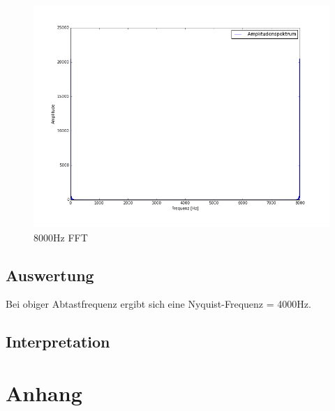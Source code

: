 \documentclass[12pt,oneside,a4paper]{report}
\begin{document}
\begin{figure}[H]
\centering\small
\includegraphics[scale=0.4]{src/8000fft.png}
\caption{8000Hz FFT}
\label{fig:8000_FFT}
\end{figure}


\section{Auswertung}
\label{chap:VERSUCH_4_AUSWERTUNG}
Bei obiger Abtastfrequenz ergibt sich eine Nyquist-Frequenz = 4000Hz.

\section{Interpretation}
\label{chap:VERSUCH_4_INTERPRETATION}
%
%
\renewcommand\thesection{A.\arabic{section}}
\renewcommand\thesubsection{\thesection.\arabic{subsection}}

\chapter*{Anhang}
\label{chap:APPENDIX}
\addtocounter{chapter}{1}
\setcounter{section}{0}
\end{document}
